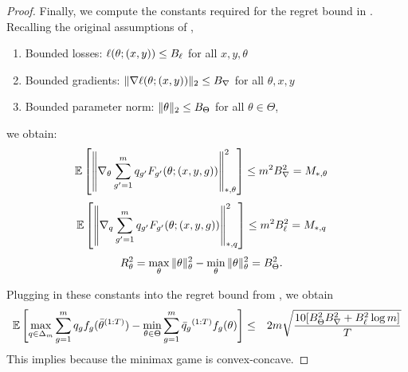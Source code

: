 \begin{proof}
  Finally, we compute the constants required for the regret bound in .
  Recalling the original assumptions of ,
  \begin{enumerate}
      \item Bounded losses: $\ell(\theta; (x,y))\le B_\ell$ for all $x,y,\theta$
      \item Bounded gradients: $\|\nabla \ell(\theta; (x,y)) \|_2\le B_\nabla$ for all $\theta,x,y$
      \item Bounded parameter norm: $\|\theta\|_2 \le B_\Theta$ for all $\theta \in \Theta$,
  \end{enumerate}
  we obtain:
  \begin{align}
      \mathbb{E}\left[\left\|\nabla_\theta \sum_{g^\prime=1}^m q_{g^\prime} F_{g^\prime}(\theta; (x,y,g)) \right\|^2_{*,\theta}\right]
      &\le m^2 B_\nabla ^2
      =M_{*,\theta}
  \end{align}
  \begin{align}
      \mathbb{E}\left[\left\|\nabla_{q} \sum_{g^\prime=1}^m q_{g^\prime} F_{g^\prime}(\theta; (x,y,g)) \right\|^2_{*,q}\right]
      &\le m^2 B_\ell ^2
      = M_{*,q}
  \end{align}
  \begin{align}
      R_\theta^2
      &= \max_\theta \|\theta\|^2_\theta - \min_\theta \|\theta\|^2_\theta
      = B_\Theta^2.
  \end{align}

  Plugging in these constants into the regret bound from ,
  we obtain
  \begin{align}
      &\mathbb{E}\left[\max_{q\in\Delta_m} \sum_{g=1}^m q_g f_g(\bar{\theta}{^{(1:T)}}) - \min_{\theta\in\Theta} \sum_{g=1}^m \bar{q}_g{^{(1:T)}} f_g(\theta) \right]
      \le & 2m\sqrt{\frac{10[B_\Theta^2B_\nabla^2 + B_\ell^2\log m]}{T}}
  \end{align}
This implies  because the minimax game is convex-concave.
\end{proof}
